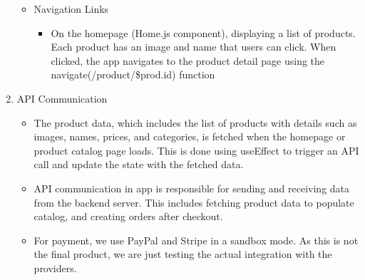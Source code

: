 \documentclass{llncs}
\begin{document}
\begin{enumerate}
\begin{itemize}
              \item Navigation Links
                    \begin{itemize}
                        \item On the homepage (Home.js component), displaying a list of products. Each product has an image and name that users can click. When clicked, the app navigates to the product detail page using the navigate(/product/\${prod.id}) function
                    \end{itemize}
          \end{itemize}
    \item API Communication
          \begin{itemize}
              \item The product data, which includes the list of products with details such as images, names, prices, and categories, is fetched when the homepage or product catalog page loads.
                    This is done using useEffect to trigger an API call and update the state with the fetched data.
              \item API communication in app is responsible for sending and receiving data from the backend server. This includes fetching product data to populate catalog, and creating orders after checkout.
              \item For payment, we use PayPal and Stripe in a sandbox mode. As this is not the final product, we are just testing the actual integration with the providers.
          \end{itemize}

\end{enumerate}
\end{document}
